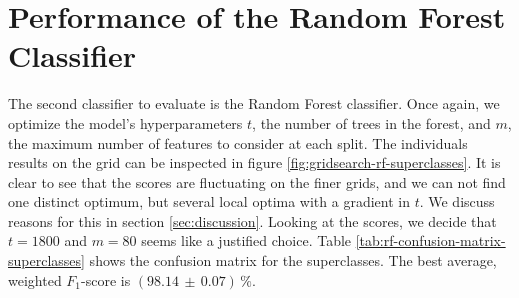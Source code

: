 \section{Performance of the Random Forest Classifier}
\label{sec:performance-rf}

The second classifier to evaluate is the Random Forest classifier. Once again, we optimize the model's hyperparameters $t$, the number of trees in the forest, and $m$, the maximum number of features to consider at each split. The individuals results on the grid can be inspected in figure \ref{fig:gridsearch-rf-superclasses}. It is clear to see that the scores are fluctuating on the finer grids, and we can not find one distinct optimum, but several local optima with a gradient in $t$. We discuss reasons for this in section \ref{sec:discussion}. Looking at the scores, we decide that $t = 1800$ and $m = 80$ seems like a justified choice. Table \ref{tab:rf-confusion-matrix-superclasses} shows the confusion matrix for the superclasses. The best average, weighted $F_1$-score is $(98.14 \, \pm \, 0.07) \, \%$.\\

